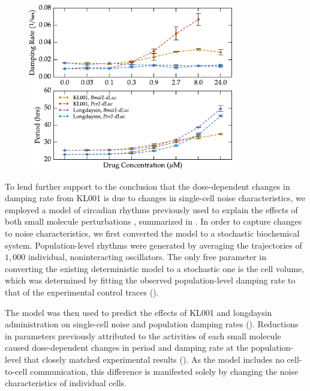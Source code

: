 \begin{figure}[tbp]
  \begin{center}
    \includegraphics[width=0.8\textwidth]{chap6/figures/mainfig_dose_b.pdf}
  \end{center}
\label{fig:dose_dependence_b}
\end{figure}

To lend further support to the conclusion that the dose-dependent changes in damping rate from KL001 is due to changes in single-cell noise characteristics, we employed a model of circadian rhythms previously used to explain the effects of both small molecule perturbations \cite{St.John2014}, summarized in .
In order to capture changes to noise characteristics, we first converted the model to a stochastic biochemical system.
Population-level rhythms were generated by averaging the trajectories of $1,000$ individual, noninteracting oscillators.
The only free parameter in converting the existing deterministic model to a stochastic one is the cell volume, which was determined by fitting the observed population-level damping rate to that of the experimental control traces ().

The model was then used to predict the effects of KL001 and longdaysin administration on single-cell noise and population damping rates ().
Reductions in parameters previously attributed to the activities of each small molecule caused dose-dependent changes in period and damping rate at the population-level that closely matched experimental results ().
As the model includes no cell-to-cell communication, this difference is manifested solely by changing the noise characteristics of individual cells.

